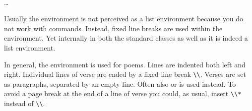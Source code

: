 \ifCommonscrextend\else
\begin{Declaration}
  \\
  \quad\dots\\
\end{Declaration}%
%
Usually the  environment is not perceived as a list
environment because you do not work with 
commands. Instead, fixed line breaks are used within the
 environment. Yet internally in both the
standard classes as well as {\KOMAScript} it is indeed a list
environment.

In general, the  environment is used for
poems.  Lines are indented both left and
right. Individual lines of verse are ended by a fixed line break
\verb|\\|. Verses are set as paragraphs, separated by an empty
line. Often also  or
 is used instead. To avoid a page
break at the end of a line of verse you could, as usual, insert \verb|\\*|
instead of \verb|\\|.
\ifCommonmaincls
